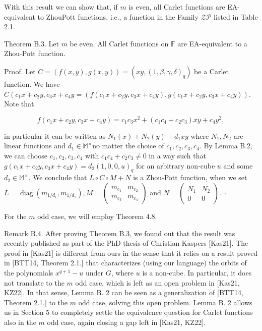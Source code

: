 \documentclass[10pt]{article}
\begin{document}
With this result we can show that, if $m$ is even, all Carlet functions are EA-equivalent to ZhouPott functions, i.e., a function in the Family $\mathcal{Z} \mathcal{P}$ listed in Table 2.1.

Theorem B.3. Let $m$ be even. All Carlet functions on $\mathbb{F}$ are EA-equivalent to a Zhou-Pott function.

Proof. Let $C=(f(x, y), g(x, y))=\left(x y,(1, \beta, \gamma, \delta)_{q}\right)$ be a Carlet function. We have $C\left(c_{1} x+\right. c_{2} y, c_{3} x+c_{4} y=\left(f\left(c_{1} x+c_{2} y, c_{3} x+c_{4} y\right), g\left(c_{1} x+c_{2} y, c_{3} x+c_{4} y\right)\right)$. Note that

$$
f\left(c_{1} x+c_{2} y, c_{3} x+c_{4} y\right)=c_{1} c_{3} x^{2}+\left(c_{1} c_{4}+c_{2} c_{3}\right) x y+c_{4} y^{2},
$$

in particular it can be written as $N_{1}(x)+N_{2}(y)+d_{1} x y$ where $N_{1}, N_{2}$ are linear functions and $d_{1} \in \mathbb{M}^{\times}$no matter the choice of $c_{1}, c_{2}, c_{3}, c_{4}$. By Lemma B.2, we can choose $c_{1}, c_{2}, c_{3}, c_{4}$ with $c_{1} c_{4}+c_{2} c_{3} \neq 0$ in a way such that $g\left(c_{1} x+c_{2} y, c_{3} x+c_{4} y\right)=d_{2}(1,0,0, u)_{q}$ for an arbitrary non-cube $u$ and some $d_{2} \in \mathbb{M}^{\times}$. We conclude that $L \circ C \circ M+N$ is a Zhou-Pott function, when we set $L=\operatorname{diag}\left(m_{1 / d_{1}}, m_{1 / d_{2}}\right), M=\left(\begin{array}{ll}m_{c_{1}} & m_{c_{2}} \\ m_{c_{3}} & m_{c_{4}}\end{array}\right)$ and $N=\left(\begin{array}{cc}N_{1} & N_{2} \\ 0 & 0\end{array}\right)$. \(\square\)

For the $m$ odd case, we will employ Theorem 4.8.

Remark B.4. After proving Theorem B.3, we found out that the result was recently published as part of the PhD thesis of Christian Kaspers [Kas21]. The proof in [Kas21] is different from ours in the sense that it relies on a result proved in [BTT14, Theorem 2.1.] that characterizes (using our language) the orbits of the polynomials $x^{q+1}-u$ under $G$, where $u$ is a non-cube. In particular, it does not translate to the $m$ odd case, which is left as an open problem in [Kas21, KZ22]. In that sense, Lemma B. 2 can be seen as a generalization of [BTT14, Theorem 2.1.] to the $m$ odd case, solving this open problem. Lemma B. 2 allows us in Section 5 to completely settle the equivalence question for Carlet functions also in the $m$ odd case, again closing a gap left in [Kas21, KZ22].
\end{document}
